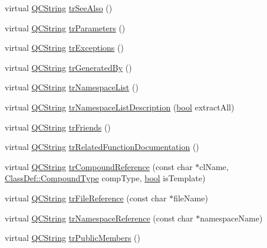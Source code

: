 \begin{DoxyCompactItemize}
virtual \hyperlink{class_q_c_string}{Q\+C\+String} \hyperlink{class_translator_czech_a7499e6d6b448ac0ebed45dd8ee7333cd}{tr\+See\+Also} ()
\item 
virtual \hyperlink{class_q_c_string}{Q\+C\+String} \hyperlink{class_translator_czech_a843873a1fd5080a9d2ea62597c288061}{tr\+Parameters} ()
\item 
virtual \hyperlink{class_q_c_string}{Q\+C\+String} \hyperlink{class_translator_czech_af1f3a72b737a602f598d5bf13b7fa20d}{tr\+Exceptions} ()
\item 
virtual \hyperlink{class_q_c_string}{Q\+C\+String} \hyperlink{class_translator_czech_a911e4ad824acd4622a92776b6a81230c}{tr\+Generated\+By} ()
\item 
virtual \hyperlink{class_q_c_string}{Q\+C\+String} \hyperlink{class_translator_czech_acdcccfdbbd0cf73c47cea3989a3b0941}{tr\+Namespace\+List} ()
\item 
virtual \hyperlink{class_q_c_string}{Q\+C\+String} \hyperlink{class_translator_czech_a2d6f887ee56fb3cf823aea320c23a004}{tr\+Namespace\+List\+Description} (\hyperlink{qglobal_8h_a1062901a7428fdd9c7f180f5e01ea056}{bool} extract\+All)
\item 
virtual \hyperlink{class_q_c_string}{Q\+C\+String} \hyperlink{class_translator_czech_a46d5702c25567bff0e62944c37010ead}{tr\+Friends} ()
\item 
virtual \hyperlink{class_q_c_string}{Q\+C\+String} \hyperlink{class_translator_czech_a652d74ab5a73e013a1ccc53a07f4f17a}{tr\+Related\+Function\+Documentation} ()
\item 
virtual \hyperlink{class_q_c_string}{Q\+C\+String} \hyperlink{class_translator_czech_aef9fd54ecb9da99a12d4dc87167a8d0e}{tr\+Compound\+Reference} (const char $\ast$cl\+Name, \hyperlink{class_class_def_ae70cf86d35fe954a94c566fbcfc87939}{Class\+Def\+::\+Compound\+Type} comp\+Type, \hyperlink{qglobal_8h_a1062901a7428fdd9c7f180f5e01ea056}{bool} is\+Template)
\item 
virtual \hyperlink{class_q_c_string}{Q\+C\+String} \hyperlink{class_translator_czech_a72e7c6f87ad0307a9e3b9897861bfa0c}{tr\+File\+Reference} (const char $\ast$file\+Name)
\item 
virtual \hyperlink{class_q_c_string}{Q\+C\+String} \hyperlink{class_translator_czech_a90101f15663ae5bfb1600402ed8c5547}{tr\+Namespace\+Reference} (const char $\ast$namespace\+Name)
\item 
virtual \hyperlink{class_q_c_string}{Q\+C\+String} \hyperlink{class_translator_czech_ac87049fdce3545348b667957f01b0723}{tr\+Public\+Members} ()

\end{DoxyCompactItemize}
